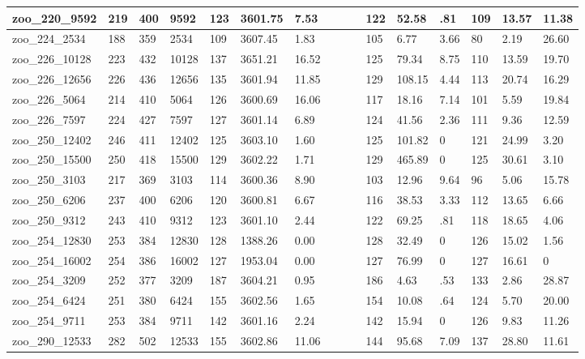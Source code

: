 \begin{landscape}
\begin{longtable}{llllllllllllllll}
zoo\_220\_9592 & 219 & 400 & 9592 & 123 & 3601.75 & 7.53 &  &  &  & 122 & 52.58 & .81 & 109 & 13.57 & 11.38 \\ \hline 
zoo\_224\_2534 & 188 & 359 & 2534 & 109 & 3607.45 & 1.83 &  &  &  & 105 & 6.77 & 3.66 & 80 & 2.19 & 26.60 \\ \hline 
zoo\_226\_10128 & 223 & 432 & 10128 & 137 & 3651.21 & 16.52 &  &  &  & 125 & 79.34 & 8.75 & 110 & 13.59 & 19.70 \\ \hline 
zoo\_226\_12656 & 226 & 436 & 12656 & 135 & 3601.94 & 11.85 &  &  &  & 129 & 108.15 & 4.44 & 113 & 20.74 & 16.29 \\ \hline 
zoo\_226\_5064 & 214 & 410 & 5064 & 126 & 3600.69 & 16.06 &  &  &  & 117 & 18.16 & 7.14 & 101 & 5.59 & 19.84 \\ \hline 
zoo\_226\_7597 & 224 & 427 & 7597 & 127 & 3601.14 & 6.89 &  &  &  & 124 & 41.56 & 2.36 & 111 & 9.36 & 12.59 \\ \hline 
zoo\_250\_12402 & 246 & 411 & 12402 & 125 & 3603.10 & 1.60 &  &  &  & 125 & 101.82 & 0 & 121 & 24.99 & 3.20 \\ \hline 
zoo\_250\_15500 & 250 & 418 & 15500 & 129 & 3602.22 & 1.71 &  &  &  & 129 & 465.89 & 0 & 125 & 30.61 & 3.10 \\ \hline 
zoo\_250\_3103 & 217 & 369 & 3103 & 114 & 3600.36 & 8.90 &  &  &  & 103 & 12.96 & 9.64 & 96 & 5.06 & 15.78 \\ \hline 
zoo\_250\_6206 & 237 & 400 & 6206 & 120 & 3600.81 & 6.67 &  &  &  & 116 & 38.53 & 3.33 & 112 & 13.65 & 6.66 \\ \hline 
zoo\_250\_9312 & 243 & 410 & 9312 & 123 & 3601.10 & 2.44 &  &  &  & 122 & 69.25 & .81 & 118 & 18.65 & 4.06 \\ \hline 
zoo\_254\_12830 & 253 & 384 & 12830 & 128 & 1388.26 & 0.00 &  &  &  & 128 & 32.49 & 0 & 126 & 15.02 & 1.56 \\ \hline 
zoo\_254\_16002 & 254 & 386 & 16002 & 127 & 1953.04 & 0.00 &  &  &  & 127 & 76.99 & 0 & 127 & 16.61 & 0 \\ \hline 
zoo\_254\_3209 & 252 & 377 & 3209 & 187 & 3604.21 & 0.95 &  &  &  & 186 & 4.63 & .53 & 133 & 2.86 & 28.87 \\ \hline 
zoo\_254\_6424 & 251 & 380 & 6424 & 155 & 3602.56 & 1.65 &  &  &  & 154 & 10.08 & .64 & 124 & 5.70 & 20.00 \\ \hline 
zoo\_254\_9711 & 253 & 384 & 9711 & 142 & 3601.16 & 2.24 &  &  &  & 142 & 15.94 & 0 & 126 & 9.83 & 11.26 \\ \hline 
zoo\_290\_12533 & 282 & 502 & 12533 & 155 & 3602.86 & 11.06 &  &  &  & 144 & 95.68 & 7.09 & 137 & 28.80 & 11.61 \\ \hline 

\end{longtable}
\end{landscape}
